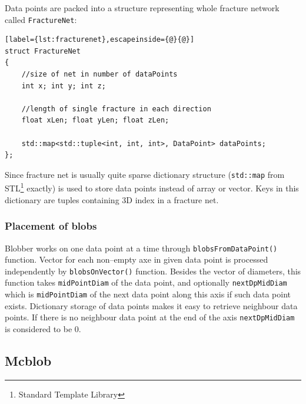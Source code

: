Data points are packed into a structure representing whole fracture network
called \texttt{FractureNet}:
\begin{lstlisting}[label={lst:fracturenet},escapeinside={@}{@}]
struct FractureNet
{
	//size of net in number of dataPoints
	int x; int y; int z;
	
	//length of single fracture in each direction
	float xLen; float yLen; float zLen;
	
	std::map<std::tuple<int, int, int>, DataPoint> dataPoints;
};
\end{lstlisting}

Since fracture net is usually quite sparse dictionary structure
(\texttt{std::map} from STL\footnote{Standard Template Library} exactly) is
used to store data points instead of array or vector. Keys in this dictionary
are tuples containing 3D index in a fracture net.

\subsubsection{Placement of blobs}

Blobber works on one data point at a time through \texttt{blobsFromDataPoint()}
function. Vector for each non--empty axe in given data point is processed
independently by \texttt{blobsOnVector()} function. Besides the vector of diameters, this
function takes \texttt{midPointDiam} of the data point, and optionally
\texttt{nextDpMidDiam} which is \texttt{midPointDiam} of the next data point
along this axis if such data point exists. Dictionary storage of data points
makes it easy to retrieve neighbour data points. If there is no neighbour data
point at the end of the axis \texttt{nextDpMidDiam} is considered to be 0.

\subsection{Mcblob}
